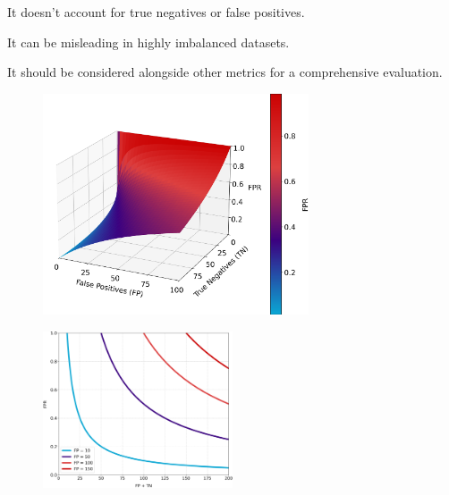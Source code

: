 {
\item It doesn't account for true negatives or false positives.
\item It can be misleading in highly imbalanced datasets.
\item It should be considered alongside other metrics for a comprehensive evaluation.
}


\clearpage
\thispagestyle{customstyle2}


\begin{figure}[ht!]
    \centering
    \includegraphics[width=0.7\textwidth]{figures/FPR_3d_surface.png}
    \label{fig1}
\end{figure}

\begin{figure}
    \centering
    \vspace{-20pt} %
    \includegraphics[width=0.5\textwidth]{figures/FPR_2d_line_plot.png} %
\end{figure}


